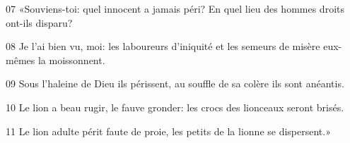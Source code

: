 
07 «Souviens-toi: quel innocent a jamais péri? En quel lieu des hommes droits ont-ils disparu?

08 Je l’ai bien vu, moi: les laboureurs d’iniquité et les semeurs de misère eux-mêmes la moissonnent.

09 Sous l’haleine de Dieu ils périssent, au souffle de sa colère ils sont anéantis.

10 Le lion a beau rugir, le fauve gronder: les crocs des lionceaux seront brisés.

11 Le lion adulte périt faute de proie, les petits de la lionne se dispersent.»
